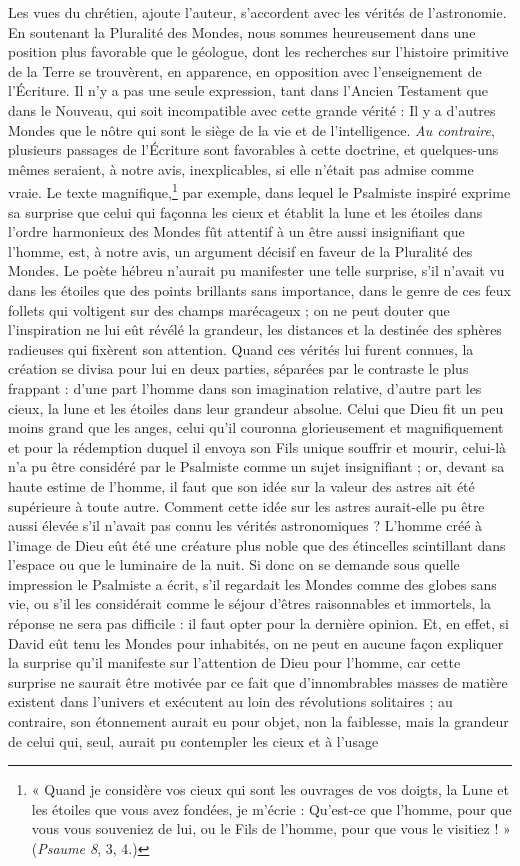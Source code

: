 \documentclass[a4paper, 11pt, oneside]{article}
\begin{document}
Les vues du chrétien, ajoute l'auteur, s'accordent avec les vérités de l'astronomie. En soutenant la Pluralité des Mondes, nous sommes heureusement dans une position plus favorable que le géologue, dont les recherches sur l'histoire primitive de la Terre se trouvèrent, en apparence, en opposition avec l'enseignement de l'Écriture. Il n'y a pas une seule expression, tant dans l'Ancien Testament que dans le Nouveau, qui soit incompatible avec cette grande vérité : Il y a d'autres Mondes que le nôtre qui sont le siège de la vie et de l'intelligence. \emph{Au contraire}, plusieurs passages de l'Écriture sont favorables à cette doctrine, et quelques-uns mêmes seraient, à notre avis, inexplicables, si elle n'était pas admise comme vraie. Le texte magnifique,\footnote{« Quand je considère vos cieux qui sont les ouvrages de vos doigts, la Lune et les étoiles que vous avez fondées, je m'écrie : Qu'est-ce que l'homme, pour que vous vous souveniez de lui, ou le Fils de l'homme, pour que vous le visitiez ! » (\emph{Psaume 8}, 3, 4.)} par exemple, dans lequel le Psalmiste inspiré exprime sa surprise que celui qui façonna les cieux et établit la lune et les étoiles dans l'ordre harmonieux des Mondes fût attentif à un être aussi insignifiant que l'homme, est, à notre avis, un argument décisif en faveur de la Pluralité des Mondes. Le poète hébreu n'aurait pu manifester une telle surprise, s'il n'avait vu dans les étoiles que des points brillants sans importance, dans le genre de ces feux follets qui voltigent sur des champs marécageux ; on ne peut douter que l'inspiration ne lui eût révélé la grandeur, les distances et la destinée des sphères radieuses qui fixèrent son attention. Quand ces vérités lui furent connues, la création se divisa pour lui en deux parties, séparées par le contraste le plus frappant : d'une part l'homme dans son imagination relative, d'autre part les cieux, la lune et les étoiles dans leur grandeur absolue. Celui que Dieu fit un peu moins grand que les anges, celui qu'il couronna glorieusement et magnifiquement et pour la rédemption duquel il envoya son Fils unique souffrir et mourir, celui-là n'a pu être considéré par le Psalmiste comme un sujet insignifiant ; or, devant sa haute estime de l'homme, il faut que son idée sur la valeur des astres ait été supérieure à toute autre. Comment cette idée sur les astres aurait-elle pu être aussi élevée s'il n'avait pas connu les vérités astronomiques ? L'homme créé à l'image de Dieu eût été une créature plus noble que des étincelles scintillant dans l'espace ou que le luminaire de la nuit. Si donc on se demande sous quelle impression le Psalmiste a écrit, s'il regardait les Mondes comme des globes sans vie, ou s'il les considérait comme le séjour d'êtres raisonnables et immortels, la réponse ne sera pas difficile : il faut opter pour la dernière opinion. Et, en effet, si David eût tenu les Mondes pour inhabités, on ne peut en aucune façon expliquer la surprise qu'il manifeste sur l'attention de Dieu pour l'homme, car cette surprise ne saurait être motivée par ce fait que d'innombrables masses de matière existent dans l'univers et exécutent au loin des révolutions solitaires ; au contraire, son étonnement aurait eu pour objet, non la faiblesse, mais la grandeur de celui qui, seul, aurait pu contempler les cieux et à l'usage 
\end{document}
